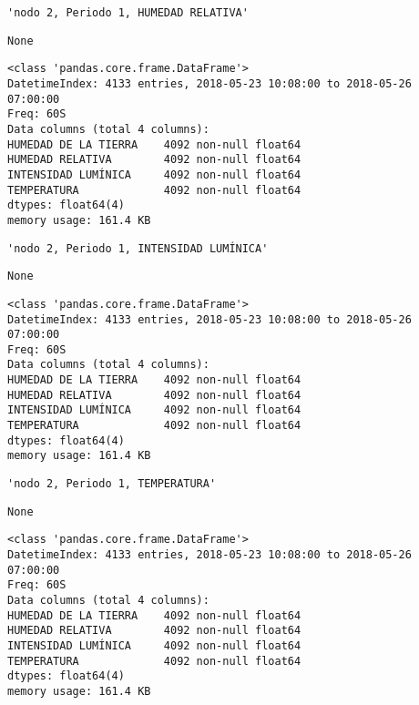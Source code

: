 \documentclass[11pt]{article}
\begin{document}
    
    \begin{verbatim}
'nodo 2, Periodo 1, HUMEDAD RELATIVA'
    \end{verbatim}

    
    
    \begin{verbatim}
None
    \end{verbatim}

    
    \begin{Verbatim}[commandchars=\\\{\}]
<class 'pandas.core.frame.DataFrame'>
DatetimeIndex: 4133 entries, 2018-05-23 10:08:00 to 2018-05-26 07:00:00
Freq: 60S
Data columns (total 4 columns):
HUMEDAD DE LA TIERRA    4092 non-null float64
HUMEDAD RELATIVA        4092 non-null float64
INTENSIDAD LUMÍNICA     4092 non-null float64
TEMPERATURA             4092 non-null float64
dtypes: float64(4)
memory usage: 161.4 KB

    \end{Verbatim}

    
    \begin{verbatim}
'nodo 2, Periodo 1, INTENSIDAD LUMÍNICA'
    \end{verbatim}

    
    
    \begin{verbatim}
None
    \end{verbatim}

    
    \begin{Verbatim}[commandchars=\\\{\}]
<class 'pandas.core.frame.DataFrame'>
DatetimeIndex: 4133 entries, 2018-05-23 10:08:00 to 2018-05-26 07:00:00
Freq: 60S
Data columns (total 4 columns):
HUMEDAD DE LA TIERRA    4092 non-null float64
HUMEDAD RELATIVA        4092 non-null float64
INTENSIDAD LUMÍNICA     4092 non-null float64
TEMPERATURA             4092 non-null float64
dtypes: float64(4)
memory usage: 161.4 KB

    \end{Verbatim}

    
    \begin{verbatim}
'nodo 2, Periodo 1, TEMPERATURA'
    \end{verbatim}

    
    
    \begin{verbatim}
None
    \end{verbatim}

    
    \begin{Verbatim}[commandchars=\\\{\}]
<class 'pandas.core.frame.DataFrame'>
DatetimeIndex: 4133 entries, 2018-05-23 10:08:00 to 2018-05-26 07:00:00
Freq: 60S
Data columns (total 4 columns):
HUMEDAD DE LA TIERRA    4092 non-null float64
HUMEDAD RELATIVA        4092 non-null float64
INTENSIDAD LUMÍNICA     4092 non-null float64
TEMPERATURA             4092 non-null float64
dtypes: float64(4)
memory usage: 161.4 KB

    \end{Verbatim}
\end{document}
